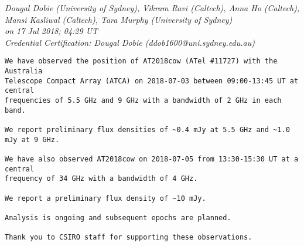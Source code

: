 \pagebreak
{}
\begin{center}
\textit{ Dougal Dobie (University of Sydney), Vikram Ravi (Caltech), Anna Ho (Caltech),\\
Mansi Kasliwal (Caltech), Tara Murphy (University of Sydney)\\
on 17 Jul 2018; 04:29 UT\\
Credential Certification: Dougal Dobie (ddob1600@uni.sydney.edu.au)}
\end{center}
\begin{verbatim}
We have observed the position of AT2018cow (ATel #11727) with the Australia
Telescope Compact Array (ATCA) on 2018-07-03 between 09:00-13:45 UT at central
frequencies of 5.5 GHz and 9 GHz with a bandwidth of 2 GHz in each band.

We report preliminary flux densities of ~0.4 mJy at 5.5 GHz and ~1.0 mJy at 9 GHz.

We have also observed AT2018cow on 2018-07-05 from 13:30-15:30 UT at a central
frequency of 34 GHz with a bandwidth of 4 GHz.

We report a preliminary flux density of ~10 mJy.

Analysis is ongoing and subsequent epochs are planned.

Thank you to CSIRO staff for supporting these observations.
\end{verbatim}

